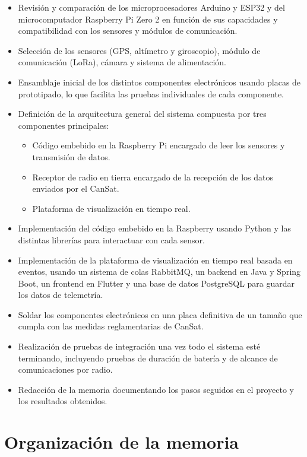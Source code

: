 \begin{itemize}
    \item Revisión y comparación de los microprocesadores Arduino y ESP32 y del microcomputador Raspberry Pi Zero 2 en función de sus capacidades y compatibilidad con los sensores y módulos de comunicación.
    \item Selección de los sensores (GPS, altímetro y giroscopio), módulo de comunicación (LoRa), cámara y sistema de alimentación.
    \item Ensamblaje inicial de los distintos componentes electrónicos usando placas de prototipado, lo que facilita las pruebas individuales de cada componente.
    \item Definición de la arquitectura general del sistema compuesta por tres componentes principales:
    \begin{itemize}
        \item Código embebido en la Raspberry Pi encargado de leer los sensores y transmisión de datos.
        \item Receptor de radio en tierra encargado de la recepción de los datos enviados por el CanSat.
        \item Plataforma de visualización en tiempo real.
    \end{itemize}
    \item Implementación del código embebido en la Raspberry usando Python y las distintas librerías para interactuar con cada sensor.
    \item Implementación de la plataforma de visualización en tiempo real basada en eventos, usando un sistema de colas RabbitMQ, un backend en Java y Spring Boot, un frontend en Flutter y una base de datos PostgreSQL para guardar los datos de telemetría.
    \item Soldar los componentes electrónicos en una placa definitiva de un tamaño que cumpla con las medidas reglamentarias de CanSat.
    \item Realización de pruebas de integración una vez todo el sistema esté terminando, incluyendo pruebas de duración de batería y de alcance de comunicaciones por radio.
    \item Redacción de la memoria documentando los pasos seguidos en el proyecto y los resultados obtenidos.
\end{itemize}


\section{Organización de la memoria}

